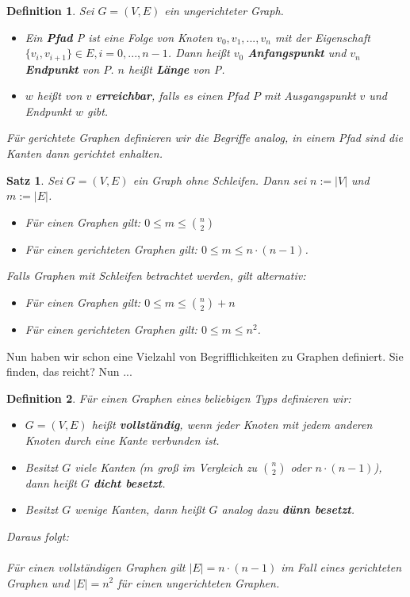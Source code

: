 \documentclass[11pt,a4paper]{scrartcl}
\newtheorem{definition}{Definition}
\newtheorem{satz}{Satz}
\begin{document}
\begin{definition}
Sei $G = (V, E)$ ein ungerichteter Graph.
\begin{itemize}
\item Ein \textbf{Pfad} P ist eine Folge von Knoten $v_0, v_1, ..., v_n$ mit der Eigenschaft $\{v_{i}, v_{i+1}\} \in E, i = 0, ..., n-1$. Dann heißt $v_0$ \textbf{Anfangspunkt} und $v_n$ \textbf{Endpunkt} von $P$. $n$ heißt \textbf{Länge} von P.
\item $w$ heißt von $v$ \textbf{erreichbar}, falls es einen Pfad $P$ mit Ausgangspunkt $v$ und Endpunkt $w$ gibt.
\end{itemize}
Für gerichtete Graphen definieren wir die Begriffe analog, in einem Pfad sind die Kanten dann gerichtet enhalten.
\end{definition}
\begin{satz}
Sei $G=(V, E)$ ein Graph ohne Schleifen. Dann sei $n := \vert V \vert$ und $m := \vert E \vert$.
\begin{itemize}
\item Für einen Graphen gilt: $0 \leq m \leq \binom{n}{2}$
\item Für einen gerichteten Graphen gilt: $0 \leq m \leq n \cdot (n-1)$.
\end{itemize}
Falls Graphen mit Schleifen betrachtet werden, gilt alternativ:
\begin{itemize}
\item Für einen Graphen gilt: $0 \leq m \leq \binom{n}{2}+n$
\item Für einen gerichteten Graphen gilt: $0 \leq m \leq n^{2}$.
\end{itemize}
\end{satz}
Nun haben wir schon eine Vielzahl von Begrifflichkeiten zu Graphen definiert. Sie finden, das reicht? Nun ...
\begin{definition} Für einen Graphen eines beliebigen Typs definieren wir:
\begin{itemize}
\item $G=(V, E)$ heißt \textbf{vollständig}, wenn jeder Knoten mit jedem anderen Knoten durch eine Kante verbunden ist.
\item Besitzt $G$ viele Kanten ($m$ groß im Vergleich zu $\binom{n}{2}$ oder $n \cdot (n-1)$), dann heißt $G$ \textbf{dicht besetzt}.
\item Besitzt $G$ wenige Kanten, dann heißt $G$ analog dazu \textbf{dünn besetzt}.
\end{itemize}
Daraus folgt: \\\\
Für einen vollständigen Graphen gilt $\vert E \vert = n \cdot (n-1)$ im Fall eines gerichteten Graphen und $\vert E \vert = n^{2}$ für einen ungerichteten Graphen.
\end{definition} 
\end{document}
